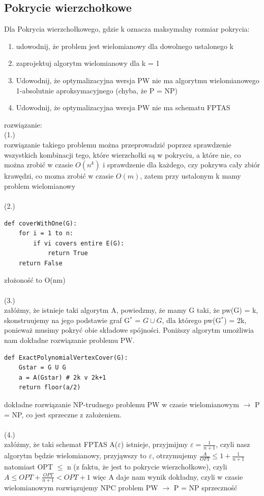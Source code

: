 \documentclass{article}
\begin{document}
\subsection*{Pokrycie wierzchołkowe}
Dla Pokrycia wierzchołkowego, gdzie k oznacza maksymalny rozmiar pokrycia:
\begin{enumerate}
	\item udowodnij, że problem jest wielomianowy dla dowolnego ustalonego k
	\item zaprojektuj algorytm wielomianowy dla k = 1
	\item Udowodnij, że optymalizacyjna wersja PW nie ma algorytmu wielomianowego 1-absolutnie aproksymacyjnego (chyba, że P = NP)
	\item Udowodnij, że optymalizacyjna wersja PW nie ma schematu FPTAS
\end{enumerate}
rozwiązanie: \\
(1.) \\
rozwiązanie takiego problemu można przeprowadzić poprzez
sprawdzenie wszystkich kombinacji tego, które wierzchołki są w pokryciu,
a które nie, co można zrobić w czasie $O(n^k)$ i sprawdzenie dla każdego, czy 
pokrywa cały zbiór krawędzi, co mozna zrobić w czasie $O(m)$, zatem 
przy ustalonym k mamy problem wielomianowy \\\\
(2.) 
\begin{lstlisting}
def coverWithOne(G):
	for i = 1 to n:
		if vi covers entire E(G):
			return True
	return False
\end{lstlisting}
złożoność to O(nm) \\\\
(3.) \\
załóżmy, że istnieje taki algorytm A,  powiedzmy, że mamy G
taki, że pw(G) = k, skonstruujemy na jego podstawie graf G$^*$ = $G \cup G$,
dla którego pw(G$^*$) = 2k, ponieważ musimy pokryć obie składowe spójności.
Poniższy algorytm umożliwia nam dokładne rozwiązanie problemu PW.
\begin{lstlisting}
def ExactPolynomialVertexCover(G):
	Gstar = G U G
	a = A(Gstar) # 2k v 2k+1
	return floor(a/2)
\end{lstlisting}
dokładne rozwiązanie NP-trudnego problemu PW w czasie wielomianowym 
$\rightarrow$ P = NP, co jest sprzeczne z założeniem. \\\\
(4.) \\
załóżmy, że taki schemat FPTAS A($\varepsilon$) istnieje, 
przyjmijmy $\varepsilon = \frac{1}{n+1}$, czyli nasz algorytm będzie wielomianowy,
przyjąwszy to $\varepsilon$, otrzymujemy $\frac{A}{OPT} \le 1 + \frac{1}{n+1}$ natomiast
OPT $\le$ n (z faktu, że jest to pokrycie wierzchołkowe),
czyli $A \le OPT + \frac{OPT}{n+1} < OPT + 1$ więc A daje nam wynik dokładny, czyli
w czasie wielomianowym rozwiązujemy NPC problem PW $\rightarrow$ P = NP sprzeczność
\end{document}
